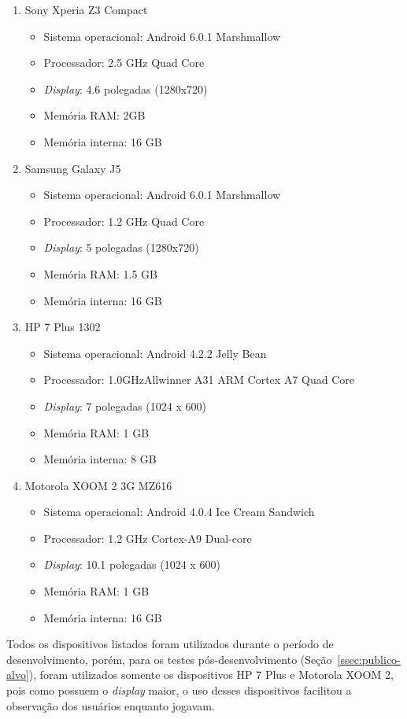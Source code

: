 \begin{enumerate}
	\item Sony Xperia Z3 Compact
	\begin{itemize}
		\item Sistema operacional: Android 6.0.1 Marshmallow
		\item Processador: 2.5 GHz Quad Core
		\item \textit{Display}: 4.6 polegadas (1280x720)
		\item Memória RAM: 2GB
		\item Memória interna: 16 GB
	\end{itemize}
	\item Samsung Galaxy J5
	\begin{itemize}
		\item Sistema operacional: Android 6.0.1 Marshmallow
		\item Processador: 1.2 GHz Quad Core
		\item \textit{Display}: 5 polegadas (1280x720)
		\item Memória RAM: 1.5 GB
		\item Memória interna: 16 GB
	\end{itemize}
	\item HP 7 Plus 1302
	\begin{itemize}
		\item Sistema operacional: Android 4.2.2 Jelly Bean
		\item Processador: 1.0GHzAllwinner A31 ARM Cortex A7 Quad Core
		\item \textit{Display}: 7 polegadas (1024 x 600)
		\item Memória RAM: 1 GB
		\item Memória interna: 8 GB
	\end{itemize}
	\item Motorola XOOM 2 3G MZ616
	\begin{itemize}
		\item Sistema operacional: Android 4.0.4 Ice Cream Sandwich
		\item Processador: 1.2 GHz Cortex-A9 Dual-core 
		\item \textit{Display}: 10.1 polegadas (1024 x 600)
		\item Memória RAM: 1 GB
		\item Memória interna: 16 GB
	\end{itemize}
\end{enumerate}

Todos os dispositivos listados foram utilizados durante o período de desenvolvimento, porém, para os testes pós-desenvolvimento (Seção~\ref{ssec:publico-alvo}), foram utilizados somente os dispositivos HP 7 Plus e Motorola XOOM 2, pois como possuem o \textit{display} maior, o uso desses dispositivos facilitou a observação dos usuários enquanto jogavam. 

